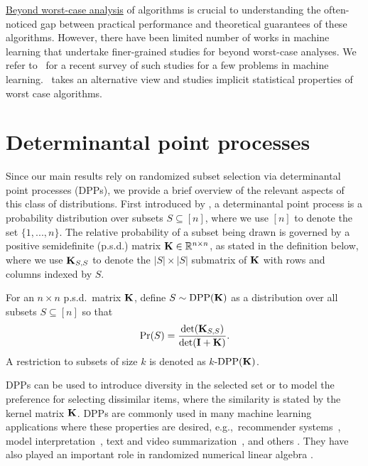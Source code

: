 \documentclass{article}
\begin{document}
\underline{Beyond worst-case analysis} of algorithms is crucial to understanding the often-noticed gap between practical performance and theoretical guarantees of these algorithms. However, there have been limited number of works in machine learning that undertake finer-grained studies for beyond worst-case analyses. We refer to~\citet{roughgarden2019beyond} for a recent survey of such studies for a few problems in machine learning.~\citet{Mah12} takes an alternative view and studies implicit statistical properties of worst case algorithms. 

\section{Determinantal point processes}
\label{s:dpp}

Since our main results rely on randomized subset selection via
determinantal point processes (DPPs), we provide a brief overview of
the relevant aspects of this class of distributions.
First introduced by \citet{Macchi1975}, a determinantal point process is a
probability distribution over subsets $S \subseteq[n]$, where we use $[n]$
to denote the set $\{1,...,n\}$. The relative probability of a subset being drawn is 
governed by a positive semidefinite (p.s.d.) matrix $\mathbf K \in \mathbb R^{n\times n}$,
as stated in the definition below, where we use $\mathbf K_{S,S}$ to denote
the $|S|\times |S|$ submatrix of $\mathbf K$ with rows and columns indexed
by $S$.
\begin{definition}\label{d:dpp}
  For an $n\times n$ p.s.d.~matrix $\mathbf K$, define $S\sim
  {\mathrm{DPP}}(\mathbf K)$ as a distribution 
  over all subsets $S\subseteq [n]$ so
  that
  \[\mathrm{Pr}(S)=\frac{\det(\mathbf K_{S,S})}{\det(\mathbf I+\mathbf K)}.\]
A restriction to subsets of size $k$ is denoted as $k$-${\mathrm{DPP}}(\mathbf K)$.
\end{definition}
DPPs can be used to introduce diversity in the selected set or to
model the preference for selecting dissimilar items, where the
similarity is stated by the kernel matrix $\mathbf K$. DPPs are
commonly used in many machine learning applications where these
properties are desired, e.g.,~recommender systems~\citep{Warlop2019}, model
interpretation~\citep{kim:2016MMD}, text
and video summarization~\citep{dpp-video}, and others
\citep{dpp-ml}. They have also played an important role in randomized
numerical linear algebra \citep{dpps-in-randnla}.
\end{document}
